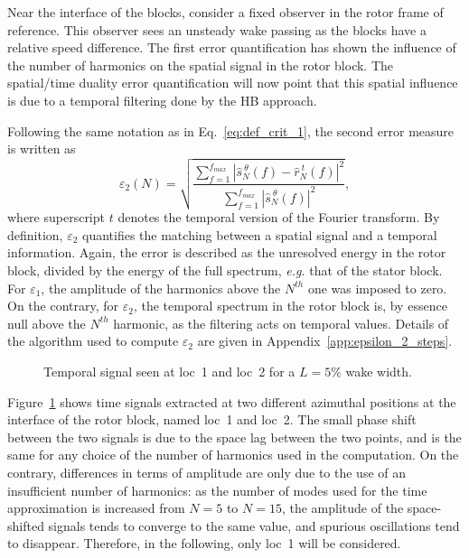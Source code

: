 Near the interface of the blocks, consider a fixed observer in
the rotor frame of reference. This observer sees an unsteady 
wake passing as the blocks have a relative speed difference.
The first error quantification has shown the 
influence of the number of harmonics on the spatial signal 
in the rotor block. The spatial/time 
duality error quantification will now
point that this spatial influence is due to a temporal filtering done by
the HB approach.

Following the same notation as in Eq.~\eqref{eq:def_crit_1}, 
the second error measure is written as
\begin{equation}
    \varepsilon_2(N) = \sqrt{
    \frac{\sum_{f=1}^{f_{max}} | \widehat{s}^{~\theta}_N (f) - 
      \widehat{r}^{~t}_N (f)|^2}{ 
    \sum_{f=1}^{f_{max}} | \widehat{s}^{~\theta}_N (f)|^2}},
    \label{eq:def_crit_2}
\end{equation}
where superscript $t$ denotes the temporal version of
the Fourier transform.
By definition, $\varepsilon_2$
quantifies the matching between a spatial signal
and a temporal information.
Again, the error is described as the unresolved energy 
in the rotor block, 
divided by the energy of the full spectrum, 
\emph{e.g.} that of the stator block. 
For $\varepsilon_1$, the amplitude 
of the harmonics above the $N^{th}$ one was imposed to zero. 
On the contrary, for $\varepsilon_2$, the temporal spectrum 
in the rotor block is, 
by essence null above the $N^{th}$ harmonic, as the filtering 
acts on temporal values. 
Details of the algorithm used to compute $\varepsilon_2$ 
are given in Appendix~\ref{app:epsilon_2_steps}.

\begin{figure}[htp]
\centering
  \caption{Temporal signal seen at loc~1 and loc~2 for a $L=5\%$ wake width.}
  \label{fig:temp_signal}
\end{figure}
Figure~\ref{fig:temp_signal} shows time signals
extracted at two different azimuthal positions at 
the interface of the rotor block, named loc~1 and loc~2. 
The small phase shift between the two 
signals is due to the space lag between the two points, 
and is the same for any choice of the number of 
harmonics used in the computation. On the contrary, 
differences in terms of amplitude are only due 
to the use of an insufficient number of harmonics: 
as the number of modes used for the time 
approximation is increased from $N=5$ to $N=15$, 
the amplitude of the space-shifted signals 
tends to converge to the same value, and 
spurious oscillations tend to disappear. Therefore, in the following,
only loc~1 will be considered.

